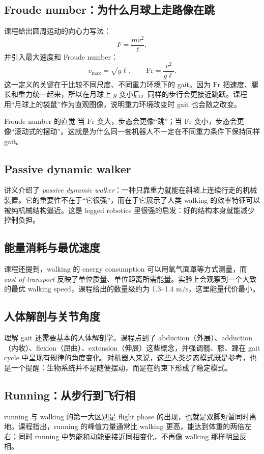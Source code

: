 \documentclass[a4paper]{article}
\begin{document}
\subsection{Froude number：为什么月球上走路像在跳}
课程给出圆周运动的向心力写法：
\[
F = \frac{mv^2}{\ell},
\]
并引入最大速度和 Froude number：
\[
v_{\max} = \sqrt{g\ell}, \qquad
\mathrm{Fr} = \frac{v^2}{g\ell}.
\]
这一定义的关键在于比较不同尺度、不同重力环境下的 gait。因为 \(\mathrm{Fr}\) 把速度、腿长和重力统一起来，所以在月球上 \(g\) 变小后，同样的步行会更接近跳跃。课程用“月球上的袋鼠”作为直观图像，说明重力环境改变时 gait 也会随之改变。

\begin{knowledgebox}{Froude number 的直觉}
当 \(\mathrm{Fr}\) 变大，步态会更像“跳”；当 \(\mathrm{Fr}\) 变小，步态会更像“滚动式的摆动”。这就是为什么同一套机器人不一定在不同重力条件下保持同样 gait。
\end{knowledgebox}

\subsection{Passive dynamic walker}
讲义介绍了 \emph{passive dynamic walker}：一种只靠重力就能在斜坡上连续行走的机械装置。它的重要性不在于“它很强”，而在于它展示了人类 walking 的效率特征可以被纯机械结构逼近。这是 legged robotics 里很强的启发：好的结构本身就能减少控制负担。

\subsection{能量消耗与最优速度}
课程还提到，walking 的 energy consumption 可以用氧气面罩等方式测量，而 \emph{cost of transport} 反映了单位质量、单位距离所需能量。实验上会观察到一个大致的最优 walking speed，课程给出的数量级约为 1.3--1.4 m/s，这里能量代价最小。

\subsection{人体解剖与关节角度}
理解 gait 还需要基本的人体解剖学。课程点到了 abduction（外展）、adduction（内收）、flexion（屈曲）、extension（伸展）这些概念，并强调髋、膝、踝在 gait cycle 中呈现有规律的角度变化。对机器人来说，这些人类步态模式既是参考，也是一个提醒：生物系统并不是随便摆动，而是在约束下形成了稳定模式。

\subsection{Running：从步行到飞行相}
running 与 walking 的第一大区别是 flight phase 的出现，也就是双脚短暂同时离地。课程指出，running 的峰值力量通常比 walking 更高，能达到体重的两倍左右；同时 running 中势能和动能更接近同相变化，不再像 walking 那样明显反相。
\end{document}
